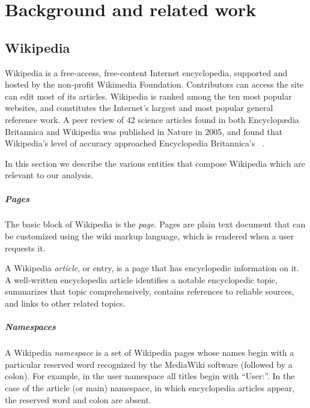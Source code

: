 
\chapter{Background and related work}
\label{cha:background}


\section{Wikipedia}
\label{sec:wiki}
Wikipedia is a free-access, free-content Internet encyclopedia, supported and hosted by the non-profit Wikimedia Foundation.
Contributors can access the site can edit most of its articles.
Wikipedia is ranked among the ten most popular websites, and constitutes the Internet's largest and most popular general reference work.
A peer review of 42 science articles found in both Encyclopædia Britannica and Wikipedia was published in Nature in 2005, and found that Wikipedia's level of accuracy approached Encyclopedia Britannica's~\cite{Giles2005} .


In this section we describe the various entities that compose Wikipedia which are relevant to our analysis.

\paragraph{Pages}
The basic block of Wikipedia is the \emph{page}.
Pages are plain text document that can be customized using the wiki markup language, which is rendered when a user requests it.

A Wikipedia \emph{article}, or entry, is a page that has encyclopedic information on it.
A well-written encyclopedia article identifies a notable encyclopedic topic, summarizes that topic comprehensively, contains references to reliable sources, and links to other related topics.

\paragraph{Namespaces}
A Wikipedia \emph{namespace} is a set of Wikipedia pages whose names begin with a particular reserved word recognized by the MediaWiki software (followed by a colon).
For example, in the user namespace all titles begin with ``User:''.
In the case of the article (or main) namespace, in which encyclopedia articles appear, the reserved word and colon are absent.

